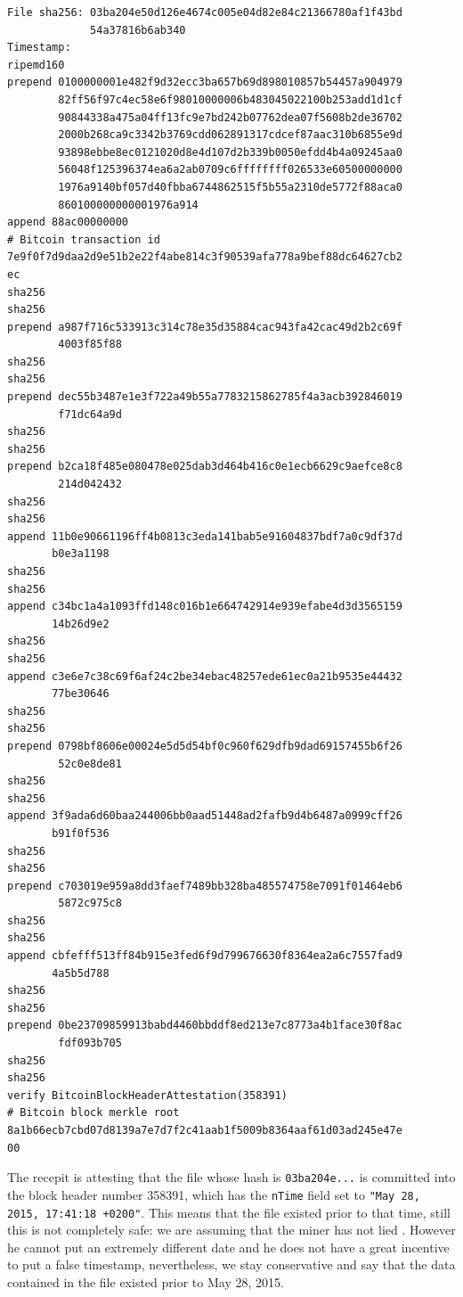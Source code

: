 \begin{Verbatim}[frame=single]
File sha256: 03ba204e50d126e4674c005e04d82e84c21366780af1f43bd
             54a37816b6ab340
Timestamp:
ripemd160
prepend 0100000001e482f9d32ecc3ba657b69d898010857b54457a904979
        82ff56f97c4ec58e6f98010000006b483045022100b253add1d1cf
        90844338a475a04ff13fc9e7bd242b07762dea07f5608b2de36702
        2000b268ca9c3342b3769cdd062891317cdcef87aac310b6855e9d
        93898ebbe8ec0121020d8e4d107d2b339b0050efdd4b4a09245aa0
        56048f125396374ea6a2ab0709c6ffffffff026533e60500000000
        1976a9140bf057d40fbba6744862515f5b55a2310de5772f88aca0
        860100000000001976a914
append 88ac00000000
# Bitcoin transaction id
7e9f0f7d9daa2d9e51b2e22f4abe814c3f90539afa778a9bef88dc64627cb2
ec
sha256
sha256
prepend a987f716c533913c314c78e35d35884cac943fa42cac49d2b2c69f
        4003f85f88
sha256
sha256
prepend dec55b3487e1e3f722a49b55a7783215862785f4a3acb392846019
        f71dc64a9d
sha256
sha256
prepend b2ca18f485e080478e025dab3d464b416c0e1ecb6629c9aefce8c8
        214d042432
sha256
sha256
append 11b0e90661196ff4b0813c3eda141bab5e91604837bdf7a0c9df37d
       b0e3a1198
sha256
sha256
append c34bc1a4a1093ffd148c016b1e664742914e939efabe4d3d3565159
       14b26d9e2
sha256
sha256
append c3e6e7c38c69f6af24c2be34ebac48257ede61ec0a21b9535e44432
       77be30646
sha256
sha256
prepend 0798bf8606e00024e5d5d54bf0c960f629dfb9dad69157455b6f26
        52c0e8de81
sha256
sha256
append 3f9ada6d60baa244006bb0aad51448ad2fafb9d4b6487a0999cff26
       b91f0f536
sha256
sha256
prepend c703019e959a8dd3faef7489bb328ba485574758e7091f01464eb6
        5872c975c8
sha256
sha256
append cbfefff513ff84b915e3fed6f9d799676630f8364ea2a6c7557fad9
       4a5b5d788
sha256
sha256
prepend 0be23709859913babd4460bbddf8ed213e7c8773a4b1face30f8ac
        fdf093b705
sha256
sha256
verify BitcoinBlockHeaderAttestation(358391)
# Bitcoin block merkle root
8a1b66ecb7cbd07d8139a7e7d7f2c41aab1f5009b8364aaf61d03ad245e47e
00
\end{Verbatim}
The recepit is attesting that the file whose hash is \verb|03ba204e...| is committed into the block header number 358391, which has the \verb|nTime| field set to \verb|"May 28, 2015, 17:41:18 +0200"|. This means that the file existed prior to that time, still this is not completely safe: we are assuming that the miner has not lied \cite{TimeInaccuracy}. However he cannot put an extremely different date and he does not have a great incentive to put a false timestamp, nevertheless, we stay conservative and say that the data contained in the file existed prior to May 28, 2015.

